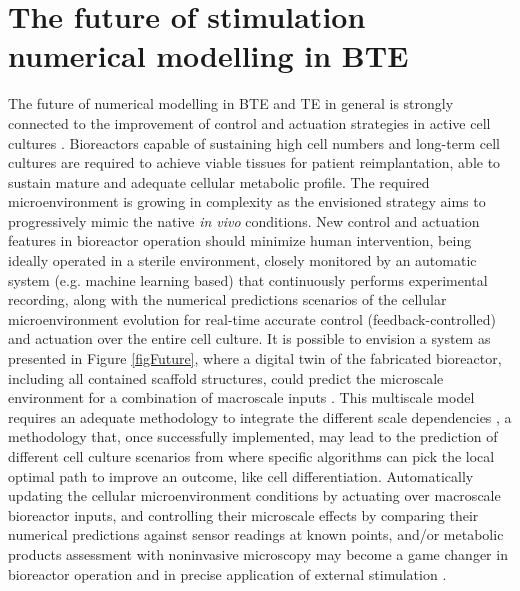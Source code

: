 \section{The future of stimulation numerical modelling in \acs{BTE}}

The future of numerical modelling in \acs{BTE} and \acs{TE} in general is strongly connected to the improvement of control and actuation strategies in active cell cultures \cite{Geris2018-tz}. Bioreactors capable of sustaining high cell numbers and long-term cell cultures are required to achieve viable tissues for patient reimplantation, able to sustain mature and adequate cellular metabolic profile. The required microenvironment is growing in complexity as the envisioned strategy aims to progressively mimic the native \textit{in vivo} conditions. New control and actuation features in bioreactor operation should minimize human intervention, being ideally operated in a sterile environment, closely monitored by an automatic system (e.g. machine learning based) that continuously performs experimental recording, along with the numerical predictions scenarios of the cellular microenvironment evolution for real-time accurate control (feedback-controlled) and actuation over the entire cell culture. It is possible to envision a system as presented in Figure \ref{figFuture}, where a digital twin of the fabricated bioreactor, including all contained scaffold structures, could predict the microscale environment for a combination of macroscale inputs \cite{Cioffi2008-kj, Spencer2013-pg}. This multiscale model requires an adequate methodology to integrate the different scale dependencies \cite{Bhattacharya2021-su}, a methodology that, once successfully implemented, may lead to the prediction of different cell culture scenarios from where specific algorithms can pick the local optimal path to improve an outcome, like cell differentiation. Automatically updating the cellular microenvironment conditions by actuating over macroscale bioreactor inputs, and controlling their microscale effects by comparing their numerical predictions against sensor readings at known points, and/or metabolic products assessment with noninvasive microscopy \cite{Neto2023-gd} may become a game changer in bioreactor operation and in precise application of external stimulation \cite{Zimmermann2023-gm, Konig2022-bs}. 

